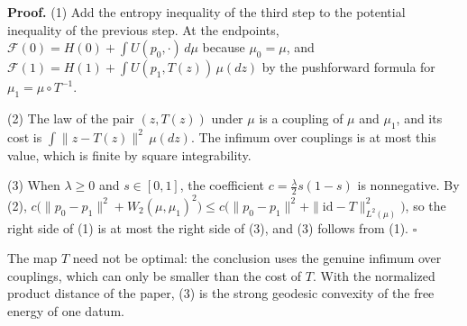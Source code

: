 \documentclass[11pt,a4paper]{report}
\begin{document}
\textbf{Proof.} (1) Add the entropy inequality of the third step to the potential inequality of the previous step. At the endpoints, \(\mathcal F(0)=H(0)+\int U(p_0,\cdot)\,d\mu\) because \(\mu_0=\mu\), and \(\mathcal F(1)=H(1)+\int U(p_1,T(z))\,\mu(dz)\) by the pushforward formula for \(\mu_1=\mu\circ T^{-1}\).




(2) The law of the pair \((z,T(z))\) under \(\mu\) is a coupling of \(\mu\) and \(\mu_1\), and its cost is \(\int\|z-T(z)\|^2\,\mu(dz)\). The infimum over couplings is at most this value, which is finite by square integrability.




(3) When \(\lambda\ge0\) and \(s\in[0,1]\), the coefficient \(c=\frac\lambda2s(1-s)\) is nonnegative. By (2), \(c\bigl(\|p_0-p_1\|^2+W_2(\mu,\mu_1)^2\bigr)\le c\bigl(\|p_0-p_1\|^2+\|\mathrm{id}-T\|_{L^2(\mu)}^2\bigr)\), so the right side of (1) is at most the right side of (3), and (3) follows from (1). \(\square\)




The map \(T\) need not be optimal: the conclusion uses the genuine infimum over couplings, which can only be smaller than the cost of \(T\). With the normalized product distance of the paper, (3) is the strong geodesic convexity of the free energy of one datum.
\end{document}
